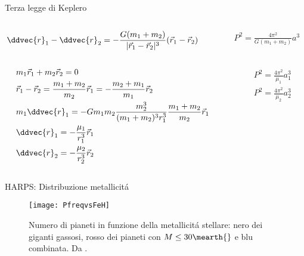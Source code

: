 \begin{wordonframe}{Terza legge di Keplero}
	\begin{columns}[c]\begin{column}{0.7\textwidth}
			\begin{align*}
			&\ddvec{r}_1-\ddvec{r}_2=-\frac{G(m_1+m_2)}{|\vec{r}_1-\vec{r}_2|^3}(\vec{r}_1-\vec{r}_2)
			\end{align*}
		\end{column} \begin{column}{0.3\textwidth}
			\begin{align*}
			&P^2=\frac{4\pi^2}{G(m_1+m_2)}a^3
			\end{align*}
	\end{column}  \end{columns}
	\begin{columns}[c]\begin{column}{0.7\textwidth}
			\begin{align*}
			&m_1\vec{r}_1+m_2\vec{r}_2=0\\
			&\vec{r}_1-\vec{r}_2=\frac{m_1+m_2}{m_2}\vec{r}_1=-\frac{m_2+m_1}{m_1}\vec{r}_2\\
			&m_1\ddvec{r}_1=-Gm_1m_2\frac{m_2^3}{(m_1+m_2)^3r_1^3}\frac{m_1+m_2}{m_2}\vec{r}_1\\
			&\ddvec{r}_1=-\frac{\mu_1}{r_1^3}\vec{r}_1\\
			&\ddvec{r}_2=-\frac{\mu_2}{r_2^3}\vec{r}_2
			\end{align*}
		\end{column} \begin{column}{0.3\textwidth}
			\begin{align*}
			&P^2=\frac{4\pi^2}{\mu_1}a_1^3\\
			&P^2=\frac{4\pi^2}{\mu_2}a_2^3
			\end{align*}
	\end{column}  \end{columns}
\end{wordonframe}

\begin{frame}{HARPS: Distribuzione metallicit\'a}
\begin{figure}[!ht]
	\centering \texttt{[image: PfreqvsFeH]}
	\caption{Numero di pianeti in funzione della metallicit\'a stellare: nero dei giganti gassosi, rosso dei pianeti con $M\leq30\mearth{}$ e blu combinata. Da \cite{mayor2011harps}.}\label{fig:PfreqvsFeH}
\end{figure}
\end{frame}


